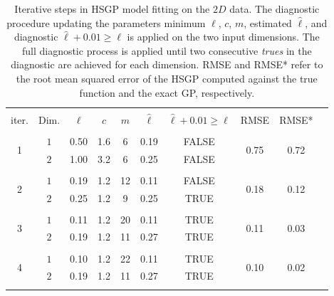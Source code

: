 
\begin{table}
\centering
\setlength{\tabcolsep}{3.6pt}
\begin{tabular}{cccccccccc}
\arrayrulecolor{gray}\hline \\[-3mm]
 iter. & Dim. & $\ell$ & $c$ & $m$ & $\hat{\ell}$ & $\hat{\ell} + 0.01 \geq \ell$ & RMSE & RMSE* \\ 
\arrayrulecolor{lightgray}\hline \\[-2mm]
 \multirow{2}{*}{ 1 } & $1$ & 0.50 & 1.6 & 6 & 0.19 & FALSE & \multirow{2}{*}{ 0.75 } & \multirow{2}{*}{ 0.72 }\\ 
 & $2$ & 1.00 & 3.2 & 6 & 0.25 & FALSE &  &  \\
\arrayrulecolor{lightgray}\hline \\[-2mm]
 \multirow{2}{*}{ 2 } & $1$ & 0.19 & 1.2 & 12 & 0.11 & FALSE  & \multirow{2}{*}{ 0.18 } & \multirow{2}{*}{ 0.12 }\\
 & $2$ & 0.25 & 1.2 & 9 & 0.25 & TRUE &  &  \\
\arrayrulecolor{lightgray}\hline \\[-2mm]
 \multirow{2}{*}{ 3 } & $1$ & 0.11 & 1.2 & 20 & 0.11 & TRUE  & \multirow{2}{*}{ 0.11 } & \multirow{2}{*}{ 0.03 }\\
 & $2$ & 0.19 & 1.2 & 11 & 0.27 & TRUE &  &  \\
\arrayrulecolor{lightgray}\hline \\[-2mm]
 \multirow{2}{*}{ 4 } & $1$ & 0.10 & 1.2 & 22 & 0.11 & TRUE  & \multirow{2}{*}{ 0.10 } & \multirow{2}{*}{ 0.02 }\\
 & $2$ & 0.19 & 1.2 & 11 & 0.27 & TRUE  &  & \\[1mm] 
\arrayrulecolor{lightgray}\hline
 \multicolumn{8}{l}{{\small Exact GP length-scales:} $\ell_{1_{GP}}=0.10$, \, $\ell_{2_{GP}}=0.29$ }
\end{tabular}
\caption{Iterative steps in HSGP model fitting on the $2D$ data. The diagnostic procedure updating the parameters minimum $\ell$, $c$, $m$, estimated $\hat{\ell}$, and diagnostic $\hat{\ell} + 0.01 \geq \ell$ is applied on the two input dimensions. The full diagnostic process is applied until two consecutive \textit{trues} in the diagnostic are achieved for each dimension. RMSE and RMSE* refer to the root mean squared error of the HSGP computed against the true function and the exact GP, respectively.}
  \label{tab_caseIII_2D}
\end{table}

